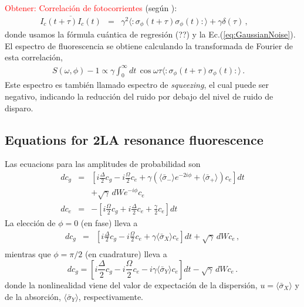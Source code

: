 \documentclass[twocolumn,aps,eqsecnum,showkeys,amsmath]{revtex4}
\providecommand{\vxp}[1]{\langle #1 \rangle}
\begin{document}
\textcolor{red}{Obtener: Correlaci\'on de  fotocorrientes} (seg\'un 
\cite{WiMi93b}): 
%
\begin{eqnarray} 	 \label{HomodyneAutoCorr}
\overline{ I_c(t+\tau) I_c(t) } &=& \gamma^2 
	\langle : \sigma_{\phi} (t+\tau) \sigma_{\phi} (t) : \rangle 
	+\gamma \delta (\tau) \,, \qquad
\end{eqnarray}
donde usamos la f\'ormula cu\'antica de regresi\'on (??) y la 
Ec.(\ref{eq:GaussianNoise}). El espectro de fluorescencia se obtiene 
calculando la transformada de Fourier de esta correlaci\'on,
%
\begin{eqnarray} 	 \label{SpectrumHom}
S(\omega,\phi)-1 \propto \gamma \int_0^{\infty} dt\, \cos{\omega \tau} 
	\langle : \sigma_{\phi} (t+\tau) \sigma_{\phi} (t) : \rangle \,. \quad
\end{eqnarray}
Este espectro es tambi\'en llamado espectro de \textit{squeezing}, 
el cual puede ser negativo, indicando la reducci\'on del ruido por debajo 
del nivel de ruido de disparo. 

\subsection{Equations for 2LA resonance fluorescence} 
Las ecuacions para las amplitudes de probabilidad son  
%
\begin{subequations}
\label{eq:HomodyneSSEamp}
\begin{eqnarray}
dc_g &=& \left[ i\frac{\Delta}{2} c_g -i\frac{\Omega}{2}  
	c_e +\gamma \left( \vxp{\bar{\sigma}_-} e^{-2i\phi} 
	+\vxp{\bar{\sigma}_+} \right) c_e  \right] dt  	\nonumber \\
&& +\sqrt{\gamma} \, dW e^{-i\phi} c_e 	\\
%
dc_e &=& -\left[ i\frac{\Omega}{2} c_g 
 	+i\frac{\Delta}{2} c_e +\frac{\gamma}{2} c_e \right] dt
\end{eqnarray}
\end{subequations}
La elecci\'on de $\phi=0$ (en fase) lleva a  
%
\begin{eqnarray*}
dc_g &=& \left[ i\frac{\Delta}{2} c_g -i\frac{\Omega}{2}  
	c_e +\gamma \vxp{\bar{\sigma}_X}  c_e \right] dt 
 	+\sqrt{\gamma} \, dW c_e  \,, \nonumber \\ 
 \end{eqnarray*}
mientras que $\phi=\pi/2$ (en cuadrature) lleva a  
%
\begin{equation*}
dc_g = \left[ i\frac{\Delta}{2} c_g -i\frac{\Omega}{2} 
 	c_e -i\gamma \vxp{\bar{\sigma}_Y}  c_e \right] dt 
	 -\sqrt{\gamma} \, dW c_e 	\,.
\end{equation*}
donde la nonlinealidad viene del valor de expectaci\'on de la 
dispersi\'on, $u= \vxp{\bar{\sigma}_X}$ y de la absorci\'on, 
$\vxp{\bar{\sigma}_Y}$, respectivamente. 
\end{document}

